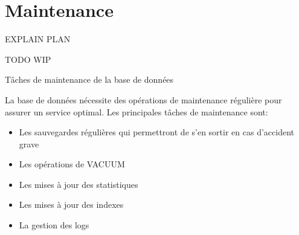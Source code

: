 
\section{Maintenance}


\begin{frame}[fragile]{EXPLAIN PLAN}

   TODO
   WIP

\begin{toile}
\end{toile}

\end{frame}


\begin{frame}[fragile]{Tâches de maintenance de la base de données}

   La base de données nécessite des opérations de maintenance régulière pour assurer un service optimal.
   Les principales tâches de maintenance sont:
   \begin{itemize}
      \item Les sauvegardes régulières qui permettront de s'en sortir en cas d'accident grave
      \item Les opérations de VACUUM
      \item Les mises à jour des statistiques
      \item Les mises à jour des indexes
      \item La gestion des logs
   \end{itemize}

\begin{toile}
\end{toile}

\end{frame}


